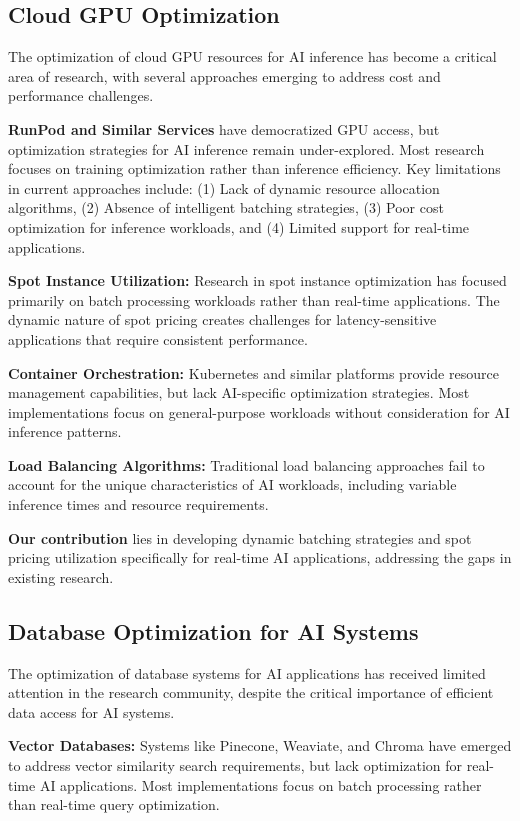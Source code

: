 \documentclass[conference]{IEEEtran}
\begin{document}
\subsection{Cloud GPU Optimization}
The optimization of cloud GPU resources for AI inference has become a critical area of research, with several approaches emerging to address cost and performance challenges.

\textbf{RunPod and Similar Services} have democratized GPU access, but optimization strategies for AI inference remain under-explored. Most research focuses on training optimization rather than inference efficiency. Key limitations in current approaches include: (1) Lack of dynamic resource allocation algorithms, (2) Absence of intelligent batching strategies, (3) Poor cost optimization for inference workloads, and (4) Limited support for real-time applications.

\textbf{Spot Instance Utilization:} Research in spot instance optimization has focused primarily on batch processing workloads rather than real-time applications. The dynamic nature of spot pricing creates challenges for latency-sensitive applications that require consistent performance.

\textbf{Container Orchestration:} Kubernetes and similar platforms provide resource management capabilities, but lack AI-specific optimization strategies. Most implementations focus on general-purpose workloads without consideration for AI inference patterns.

\textbf{Load Balancing Algorithms:} Traditional load balancing approaches fail to account for the unique characteristics of AI workloads, including variable inference times and resource requirements.

\textbf{Our contribution} lies in developing dynamic batching strategies and spot pricing utilization specifically for real-time AI applications, addressing the gaps in existing research.

\subsection{Database Optimization for AI Systems}
The optimization of database systems for AI applications has received limited attention in the research community, despite the critical importance of efficient data access for AI systems.

\textbf{Vector Databases:} Systems like Pinecone, Weaviate, and Chroma have emerged to address vector similarity search requirements, but lack optimization for real-time AI applications. Most implementations focus on batch processing rather than real-time query optimization.
\end{document}
